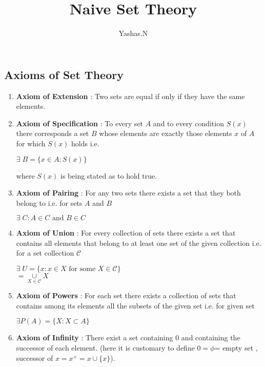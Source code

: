\documentclass[11pt]{extarticle}
\author{Yashas.N}
\title{Naive Set Theory}
\date{}
\newcommand{\w}[1]{\text{#1}}
\begin{document}
	\maketitle
	\boldmath
	
\begin{multicols}{2}
	
\section{Axioms of Set Theory }
\begin{enumerate}
	\item \textbf{Axiom of Extension} : Two sets are equal if only if they have the same elements.
	\item \textbf{Axiom of Specification} : To every set $A$ and to every condition $S(x)$ there corresponds a set $B$ whose elements are exactly those elements $x$ of $A$ for which $S(x)$ holds i.e.
	\begin{center}
		$\exists \; B=\{x\in A:S(x)\}$
	\end{center}
	where $S(x)$ is being stated as to hold true.
	\item \textbf{Axiom of Pairing} : For any two sets there exists a set that they both belong to i.e. for sets $A$ and $B$
	\begin{center}
		$\exists \; C : A\in C \w{ and } B\in C $
	\end{center}
	\item \textbf{Axiom of Union} : For every collection of sets there exists a set that contains all elements that belong to at least one set of the given collection i.e. for a set collection $\mathscr{C}$ 
	\begin{center}
		$\exists \; U =\{ x: x\in X \w{ for some }X \in \mathscr{C}\}$\\
		$= \underset{X\in \mathscr{C}}{\cup} X$
	\end{center}
	\item \textbf{Axiom of Powers} : For each set there exists a collection of sets that contains among its elements all the subsets of the given set i.e. 
	for given set 
	\begin{center}
		$\exists P(A)=\{X:X\subset A\}$
	\end{center}
	\item \textbf{Axiom of Infinity} : There exist a set containing $0$ and containing the successor of each element. (here it is customary to define $0=\phi$= empty set , successor of $x=x^+=x \cup \{x\}$).
	

\end{enumerate}
\end{multicols}
\end{document}
